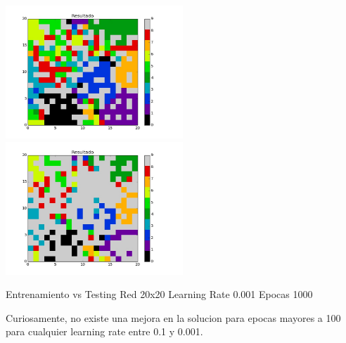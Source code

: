 \includegraphics[width=0.5\textwidth]{img/ej2_train_M_20_lrate_001_epocas_1500}
\includegraphics[width=0.5\textwidth]{img/ej2_test_M_20_lrate_001_epocas_1500}
{\center \footnotesize Entrenamiento vs Testing Red 20x20 Learning Rate 0.001 Epocas 1000\par}

Curiosamente, no existe una mejora en la solucion para epocas mayores a 100 para cualquier learning rate entre 0.1 y 0.001.

